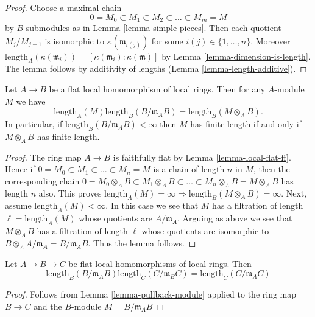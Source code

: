 \begin{proof}
Choose a maximal chain
$$
0 = M_0
\subset M_1
\subset M_2
\subset \ldots
\subset M_m = M
$$
by $B$-submodules as in Lemma \ref{lemma-simple-pieces}.
Then each quotient $M_j/M_{j - 1}$ is isomorphic to
$\kappa(\mathfrak m_{i(j)})$ for some $i(j) \in \{1, \ldots, n\}$.
Moreover
$\text{length}_A(\kappa(\mathfrak m_i)) =
[\kappa(\mathfrak m_i) : \kappa(\mathfrak m)]$ by
Lemma \ref{lemma-dimension-is-length}. The lemma follows
by additivity of lengths (Lemma \ref{lemma-length-additive}).
\end{proof}

\begin{lemma}
\label{lemma-pullback-module}
Let $A \to B$ be a flat local homomorphism of local rings.
Then for any $A$-module $M$ we have
$$
\text{length}_A(M) \text{length}_B(B/\mathfrak m_AB)
=
\text{length}_B(M \otimes_A B).
$$
In particular, if $\text{length}_B(B/\mathfrak m_AB) < \infty$
then $M$ has finite length if and only if $M \otimes_A B$ has finite length.
\end{lemma}

\begin{proof}
The ring map $A \to B$ is faithfully flat by
Lemma \ref{lemma-local-flat-ff}.
Hence if $0 = M_0 \subset M_1 \subset \ldots \subset M_n = M$
is a chain of length $n$ in $M$, then the corresponding chain
$0 = M_0 \otimes_A B \subset M_1 \otimes_A B \subset
\ldots \subset M_n \otimes_A B = M \otimes_A B$ has length $n$
also. This proves
$\text{length}_A(M) = \infty \Rightarrow
\text{length}_B(M \otimes_A B) = \infty$.
Next, assume $\text{length}_A(M) < \infty$. In this case we see
that $M$ has a filtration of length $\ell = \text{length}_A(M)$
whose quotients are $A/\mathfrak m_A$. Arguing as above
we see that $M \otimes_A B$ has a filtration of length $\ell$
whose quotients are isomorphic to
$B \otimes_A A/\mathfrak m_A =  B/\mathfrak m_AB$.
Thus the lemma follows.
\end{proof}

\begin{lemma}
\label{lemma-pullback-transitive}
Let $A \to B \to C$ be flat local homomorphisms of local rings. Then
$$
\text{length}_B(B/\mathfrak m_A B)
\text{length}_C(C/\mathfrak m_B C)
=
\text{length}_C(C/\mathfrak m_A C)
$$
\end{lemma}

\begin{proof}
Follows from Lemma \ref{lemma-pullback-module} applied to the ring map
$B \to C$ and the $B$-module $M = B/\mathfrak m_A B$
\end{proof}











